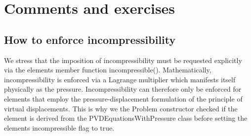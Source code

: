  

\hypertarget{index_exercises}{}\section{Comments and exercises}\label{index_exercises}
\hypertarget{index_incompr}{}\subsection{How to enforce incompressibility}\label{index_incompr}
We stress that the imposition of incompressibility must be requested explicitly via the element\textquotesingle{}s member function {\ttfamily incompressible()}. Mathematically, incompressibility is enforced via a Lagrange multiplier which manifests itself physically as the pressure. Incompressibility can therefore only be enforced for elements that employ the pressure-\/displacement formulation of the principle of virtual displacements. This is why we the {\ttfamily Problem} constructor checked if the element is derived from the {\ttfamily P\+V\+D\+Equations\+With\+Pressure} class before setting the element\textquotesingle{}s {\ttfamily incompressible} flag to {\ttfamily true}.

